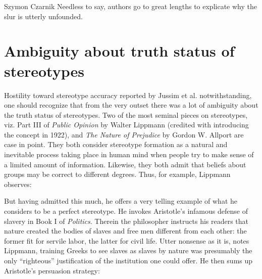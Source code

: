 \begin{artengenv}{Szymon Czarnik}
Needless to say, authors go to great lengths to explicate why the slur is utterly unfounded.

\section{Ambiguity about truth status of stereotypes}
Hostility toward stereotype accuracy reported by Jussim et al. notwithstanding, one should recognize that from the very outset there was a lot of ambiguity about the truth status of stereotypes. Two of the most seminal pieces on stereotypes, viz. Part III of \textit{Public Opinion} by Walter Lippmann (credited with introducing the concept in 1922), and \textit{The Nature of Prejudice}
by Gordon W. Allport
\parencite*[][]{allport_nature_1954} %
are case in point. They both consider stereotype formation as a natural and inevitable process taking place in human mind when people try to make sense of a limited amount of information. Likewise, they both admit that beliefs about groups may be correct to different degrees. Thus, for example, Lippmann 
\parencite*[][p.90]{lippmann_public_1998} %
 observes:


But having admitted this much, he offers a very telling example of what he considers to be a perfect stereotype. He invokes Aristotle's infamous defense of slavery in Book I of \textit{Politics}. Therein the philosopher instructs his readers that nature created the bodies of slaves and free men different from each other: the former fit for servile labor, the latter for civil life. Utter nonsense as it is, notes Lippmann, training Greeks to see slaves as slaves by nature was presumably the only ``righteous'' justification of the institution one could offer. He then sums up Aristotle's persuasion strategy:

\end{artengenv}
